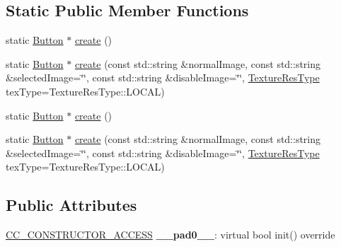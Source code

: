 \subsection*{Static Public Member Functions}
\begin{DoxyCompactItemize}
\item 
static \hyperlink{classui_1_1Button}{Button} $\ast$ \hyperlink{classui_1_1Button_a109e34aba9c15cbbc790bdcb0b67de29}{create} ()
\item 
static \hyperlink{classui_1_1Button}{Button} $\ast$ \hyperlink{classui_1_1Button_a0008ef9c3fd2bd012803a4d99422b533}{create} (const std\+::string \&normal\+Image, const std\+::string \&selected\+Image=\char`\"{}\char`\"{}, const std\+::string \&disable\+Image=\char`\"{}\char`\"{}, \hyperlink{classui_1_1Widget_a040a65ec5ad3b11119b7e16b98bd9af0}{Texture\+Res\+Type} tex\+Type=Texture\+Res\+Type\+::\+L\+O\+C\+AL)
\item 
static \hyperlink{classui_1_1Button}{Button} $\ast$ \hyperlink{classui_1_1Button_a99f75cd3aa21108bf21d4574a804daff}{create} ()
\item 
static \hyperlink{classui_1_1Button}{Button} $\ast$ \hyperlink{classui_1_1Button_a3854e1e1e8a252ea5dbd33745838030c}{create} (const std\+::string \&normal\+Image, const std\+::string \&selected\+Image=\char`\"{}\char`\"{}, const std\+::string \&disable\+Image=\char`\"{}\char`\"{}, \hyperlink{classui_1_1Widget_a040a65ec5ad3b11119b7e16b98bd9af0}{Texture\+Res\+Type} tex\+Type=Texture\+Res\+Type\+::\+L\+O\+C\+AL)
\end{DoxyCompactItemize}
\subsection*{Public Attributes}
\begin{DoxyCompactItemize}
\item 
\mbox{\label{classui_1_1Button_ac95a9b1aff3249a2fc8792fb69d79193}} 
\hyperlink{_2cocos2d_2cocos_2base_2ccConfig_8h_a25ef1314f97c35a2ed3d029b0ead6da0}{C\+C\+\_\+\+C\+O\+N\+S\+T\+R\+U\+C\+T\+O\+R\+\_\+\+A\+C\+C\+E\+SS} {\bfseries \+\_\+\+\_\+pad0\+\_\+\+\_\+}\+: virtual bool init() override
\end{DoxyCompactItemize}
